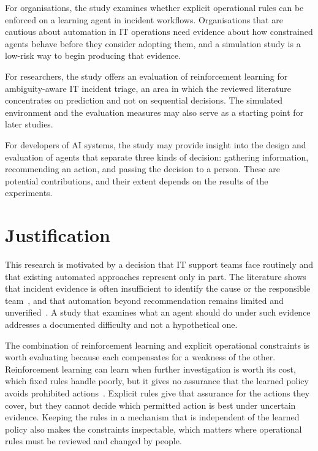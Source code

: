 \documentclass[12pt,a4paper]{article}
\begin{document}
For organisations, the study examines whether explicit operational rules can be enforced on a learning agent in incident workflows. Organisations that are cautious about automation in IT operations need evidence about how constrained agents behave before they consider adopting them, and a simulation study is a low-risk way to begin producing that evidence.

For researchers, the study offers an evaluation of reinforcement learning for ambiguity-aware IT incident triage, an area in which the reviewed literature concentrates on prediction and not on sequential decisions. The simulated environment and the evaluation measures may also serve as a starting point for later studies.

For developers of AI systems, the study may provide insight into the design and evaluation of agents that separate three kinds of decision: gathering information, recommending an action, and passing the decision to a person. These are potential contributions, and their extent depends on the results of the experiments.

\section{Justification}

This research is motivated by a decision that IT support teams face routinely and that existing automated approaches represent only in part. The literature shows that incident evidence is often insufficient to identify the cause or the responsible team~\cite{chen2020}, and that automation beyond recommendation remains limited and unverified~\cite{zhang2025}. A study that examines what an agent should do under such evidence addresses a documented difficulty and not a hypothetical one.

The combination of reinforcement learning and explicit operational constraints is worth evaluating because each compensates for a weakness of the other. Reinforcement learning can learn when further investigation is worth its cost, which fixed rules handle poorly, but it gives no assurance that the learned policy avoids prohibited actions~\cite{alshiekh2018}. Explicit rules give that assurance for the actions they cover, but they cannot decide which permitted action is best under uncertain evidence. Keeping the rules in a mechanism that is independent of the learned policy also makes the constraints inspectable, which matters where operational rules must be reviewed and changed by people.
\end{document}
